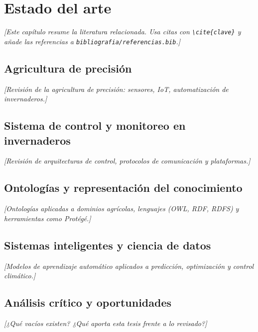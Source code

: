 
\chapter{Estado del arte}
\label{cap:estado-del-arte}

\textit{[Este capítulo resume la literatura relacionada. Usa citas con \texttt{\textbackslash cite\{clave\}}
y añade las referencias a \texttt{bibliografia/referencias.bib}.]}

\section{Agricultura de precisión}
\label{sec:agricultura-precision}

\textit{[Revisión de la agricultura de precisión: sensores, IoT, automatización de invernaderos.]}

\section{Sistema de control y monitoreo en invernaderos}
\label{sec:control-invernaderos}

\textit{[Revisión de arquitecturas de control, protocolos de comunicación y plataformas.]}

\section{Ontologías y representación del conocimiento}
\label{sec:ontologias}

\textit{[Ontologías aplicadas a dominios agrícolas, lenguajes (OWL, RDF, RDFS) y herramientas como Protégé.]}

\section{Sistemas inteligentes y ciencia de datos}
\label{sec:ia-datos}

\textit{[Modelos de aprendizaje automático aplicados a predicción, optimización y control climático.]}

\section{Análisis crítico y oportunidades}
\label{sec:analisis-critico}

\textit{[¿Qué vacíos existen? ¿Qué aporta esta tesis frente a lo revisado?]}
